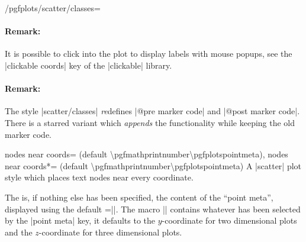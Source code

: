 {\begin{stylekey}{/pgfplots/scatter/classes=}


    \paragraph{Remark:}

    It is possible to click into the plot to display labels with mouse popups,
    see the |clickable coords| key of the |clickable| library.

    \paragraph{Remark:}

    The style |scatter/classes| \emph{re}defines |@pre marker code| and
    |@post marker code|. There is a starred variant
     which \emph{appends} the functionality
    while keeping the old marker code.
\end{stylekey}

\begin{pgfplotskeylist}{%
    nodes near coords= (default \textbackslash pgfmathprintnumber\textbackslash pgfplotspointmeta),
    nodes near coords*= (default \textbackslash pgfmathprintnumber\textbackslash pgfplotspointmeta)%
}
    A |scatter| plot style which places text nodes near every coordinate.

\begin{codeexample}[]
\end{codeexample}
    The  is, if nothing else has been specified, the content of
    the ``point meta'', displayed using the default
    =|\pgfmathprintnumber{\pgfplotspointmeta}|. The macro
    |\pgfplotspointmeta| contains whatever has been selected by the
    |point meta| key, it defaults to the $y$-coordinate for two dimensional
    plots and the $z$-coordinate for three dimensional plots.


\end{pgfplotskeylist}}
